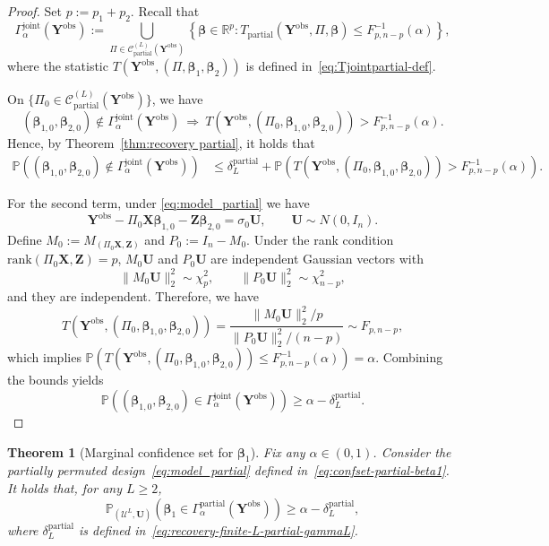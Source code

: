 \documentclass[11pt, reqno]{amsart}
\newcommand{\bP}{\mathbb{P}}
\renewcommand{\le}{\leqslant}
\renewcommand{\ge}{\geqslant}
\newcommand{\1}{\mbox{1}\hspace{-0.25em}\mbox{l}}
\newcommand{\obs}{\mathrm{obs}}
\newcommand{\rank}{\mathrm{rank}}
\theoremstyle{definition}\newtheorem{problem}{Problem}[section]
\theoremstyle{definition}\newtheorem{definition}[problem]{Definition}
\theoremstyle{remark}\newtheorem{assumption}{Assumption}
\theoremstyle{remark}\newtheorem{remark}[problem]{Remark}
\theoremstyle{definition}\newtheorem{example}[problem]{Example}
\theoremstyle{plain}\newtheorem{theorem}[problem]{Theorem}
\theoremstyle{plain}\newtheorem{question}[problem]{Question}
\theoremstyle{plain}\newtheorem{lemma}[problem]{Lemma}
\theoremstyle{plain}\newtheorem{proposition}[problem]{Proposition}
\theoremstyle{plain}\newtheorem{corollary}[problem]{Corollary}
\theoremstyle{plain}\newtheorem{conjecture}[problem]{Conjecture}
\begin{document}
\begin{proof}
Set $p:=p_1+p_2$.
Recall that
\begin{equation}\label{eq:confset-partial-joint}
\Gamma_\alpha^{\mathrm{joint}}(\bm Y^{\obs})
:=
\bigcup_{\Pi \in \mathcal{C}_{\mathrm{partial}}^{(L)}(\bm Y^{\obs})}
\left\{
\bm\beta \in \mathbb R^{p}:
T_{\mathrm{partial}}(\bm Y^{\obs},\Pi,\bm\beta)
\le F^{-1}_{p,n-p}(\alpha)
\right\},
\end{equation}
where the statistic $T(\bm Y^{\obs},(\Pi,\bm\beta_1,\bm\beta_2))$ is defined in~\eqref{eq:Tjointpartial-def}.

On $\{\Pi_0\in\mathcal C_{\mathrm{partial}}^{(L)}(\bm Y^{\obs})\}$, we have
\[
(\bm\beta_{1,0},\bm\beta_{2,0})\notin\Gamma_{\alpha}^{\mathrm{joint}}(\bm Y^{\obs})
\ \Longrightarrow\
T(\bm Y^{\obs},(\Pi_0,\bm\beta_{1,0},\bm\beta_{2,0}))>F^{-1}_{p,n-p}(\alpha).
\]
Hence, by Theorem~\ref{thm:recovery partial}, it holds that
\begin{align*}
\bP\left((\bm\beta_{1,0},\bm\beta_{2,0})\notin\Gamma_{\alpha}^{\mathrm{joint}}(\bm Y^{\obs})\right)
&\le \delta_L^{\mathrm{partial}}
+\bP\left(T(\bm Y^{\obs},(\Pi_0,\bm\beta_{1,0},\bm\beta_{2,0}))>F^{-1}_{p,n-p}(\alpha)\right).
\end{align*}

For the second term, under \eqref{eq:model_partial} we have
\[
\bm Y^{\obs}-\Pi_0\bm X\bm\beta_{1,0}-\bm Z\bm\beta_{2,0}
=\sigma_0\bm U,
\qquad \bm U\sim N(0,I_n).
\]
Define $M_0:=M_{(\Pi_0\bm X,\bm Z)}$ and $P_0:=I_n-M_0$. Under the rank condition
$\rank(\Pi_0\bm X,\bm Z)=p$, $M_0\bm U$ and $P_0\bm U$ are independent Gaussian vectors with
\[
\|M_0\bm U\|_2^2\sim \chi^2_p,
\qquad
\|P_0\bm U\|_2^2\sim \chi^2_{n-p},
\]
and they are independent. Therefore, we have
\[
T(\bm Y^{\obs},(\Pi_0,\bm\beta_{1,0},\bm\beta_{2,0}))
=\frac{\|M_0\bm U\|_2^2/p}{\|P_0\bm U\|_2^2/(n-p)}
\sim F_{p,n-p},
\]
which implies $\bP\left(T(\bm Y^{\obs},(\Pi_0,\bm\beta_{1,0},\bm\beta_{2,0}))\le F^{-1}_{p,n-p}(\alpha)\right)=\alpha$. Combining the bounds yields
\[
\bP\left((\bm\beta_{1,0},\bm\beta_{2,0})\in\Gamma_{\alpha}^{\mathrm{joint}}(\bm Y^{\obs})\right)
\ge \alpha-\delta_L^{\mathrm{partial}}.
\]
\end{proof}


\begin{theorem}[Marginal confidence set for $\bm{\beta}_1$]\label{thm:confidence set partial beta1}
Fix any $\alpha \in (0,1)$. Consider the partially permuted design~\eqref{eq:model_partial} 
defined in~\eqref{eq:confset-partial-beta1}. It holds that, for any $L \ge 2$,
\[
    \bP_{(\mathcal{U}^L, \bm{U})}\left( \bm{\beta}_1 \in \Gamma_{\alpha}^{\mathrm{partial}}(\bm{Y}^{\obs}) \right)
    \ge
    \alpha - \delta_L^{\mathrm{partial}},
\]
where $\delta_L^{\mathrm{partial}}$ is defined in~\eqref{eq:recovery-finite-L-partial-gammaL}.
\end{theorem}
\end{document}
